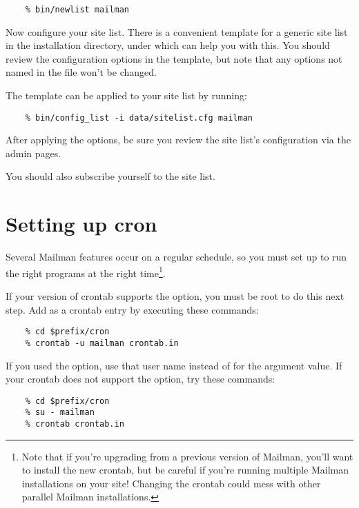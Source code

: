 \documentclass{howto}
\begin{document}
\begin{verbatim}
    % bin/newlist mailman
\end{verbatim}

Now configure your site list.  There is a convenient template for a generic
site list in the installation directory, under  which
can help you with this.  You should review the configuration options in the
template, but note that any options not named in the  file
won't be changed.

The template can be applied to your site list by
running:

\begin{verbatim}
    % bin/config_list -i data/sitelist.cfg mailman
\end{verbatim}

After applying the  options, be sure you review the
site list's configuration via the admin pages.

You should also subscribe yourself to the site list.

\section{Setting up cron}

Several Mailman features occur on a regular schedule, so you must set up
 to run the right programs at the right time\footnote{Note that
if you're upgrading from a previous version of Mailman, you'll want to install
the new crontab, but be careful if you're running multiple Mailman
installations on your site!  Changing the crontab could mess with other
parallel Mailman installations.}.

If your version of crontab supports the  option, you must be
root to do this next step.  Add  as a
crontab entry by executing these commands:

\begin{verbatim}
    % cd $prefix/cron
    % crontab -u mailman crontab.in
\end{verbatim}

If you used the  option, use that user name
instead of  for the  argument value.  If your
crontab does not support the  option, try these commands:

\begin{verbatim}
    % cd $prefix/cron
    % su - mailman
    % crontab crontab.in
\end{verbatim}
\end{document}
